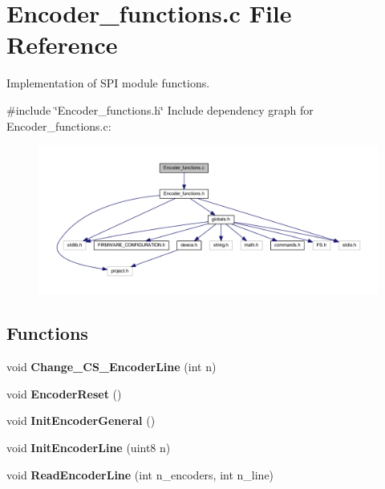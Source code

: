 \section{Encoder\+\_\+functions.\+c File Reference}
\label{_encoder__functions_8c}


Implementation of S\+PI module functions.  


{\ttfamily \#include \char`\"{}Encoder\+\_\+functions.\+h\char`\"{}}\newline
Include dependency graph for Encoder\+\_\+functions.\+c\+:\nopagebreak
\begin{figure}[H]
\begin{center}
\leavevmode
\includegraphics[width=350pt]{_encoder__functions_8c__incl}
\end{center}
\end{figure}
\subsection*{Functions}
\begin{DoxyCompactItemize}
\item 
\mbox{\label{_encoder__functions_8c_a22b528bf1b9a7a0a86b618d7195b106b}} 
void {\bfseries Change\+\_\+\+C\+S\+\_\+\+Encoder\+Line} (int n)
\item 
\mbox{\label{_encoder__functions_8c_a1f711fe1ef258ba1b0d90cbce8a0e645}} 
void {\bfseries Encoder\+Reset} ()
\item 
\mbox{\label{_encoder__functions_8c_a2ee4a1ed078be27aa04157f035933a2f}} 
void {\bfseries Init\+Encoder\+General} ()
\item 
\mbox{\label{_encoder__functions_8c_aa7dd2ab5bc6e906d2b1baa3dcf030197}} 
void {\bfseries Init\+Encoder\+Line} (uint8 n)
\item 
\mbox{\label{_encoder__functions_8c_af23a5b3c809698c750feda90e24f85fe}} 
void {\bfseries Read\+Encoder\+Line} (int n\+\_\+encoders, int n\+\_\+line)
\end{DoxyCompactItemize}


